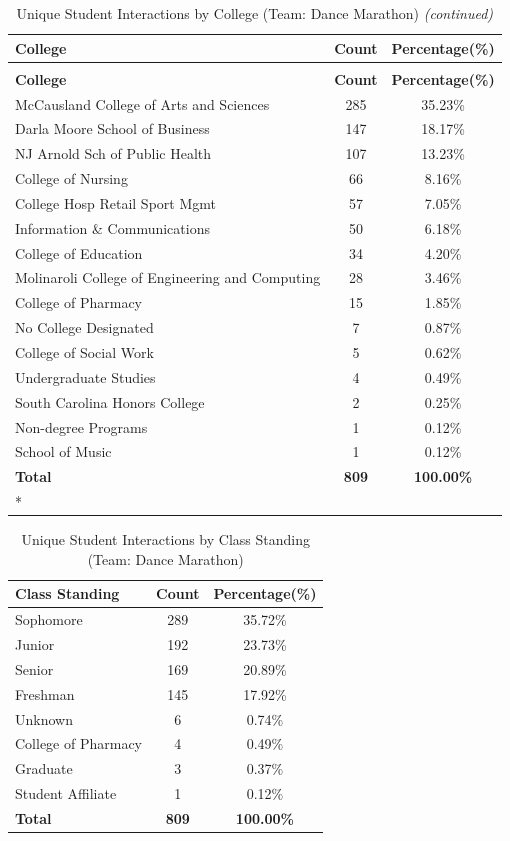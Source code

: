 \documentclass[
  letterpaper,
  DIV=11,
  numbers=noendperiod]{scrartcl}
\begin{document}
\begin{longtable}[t]{lcc}
\caption{\label{tab:CollegeTabUSCDM}Unique Student Interactions by College (Team: Dance Marathon)}\\
\toprule
\textbf{College} & \textbf{Count} & \textbf{Percentage(\%)}\\
\midrule
\endfirsthead
\caption[]{Unique Student Interactions by College (Team: Dance Marathon) \textit{(continued)}}\\
\toprule
\textbf{College} & \textbf{Count} & \textbf{Percentage(\%)}\\
\midrule
\endhead

\endfoot
\bottomrule
\endlastfoot
McCausland College of Arts and Sciences & 285 & 35.23\%\\
Darla Moore School of Business & 147 & 18.17\%\\
NJ Arnold Sch of Public Health & 107 & 13.23\%\\
College of Nursing & 66 & 8.16\%\\
College Hosp Retail Sport Mgmt & 57 & 7.05\%\\
\addlinespace
Information \& Communications & 50 & 6.18\%\\
College of Education & 34 & 4.20\%\\
Molinaroli College of Engineering and Computing & 28 & 3.46\%\\
College of Pharmacy & 15 & 1.85\%\\
No College Designated & 7 & 0.87\%\\
\addlinespace
College of Social Work & 5 & 0.62\%\\
Undergraduate Studies & 4 & 0.49\%\\
South Carolina Honors College & 2 & 0.25\%\\
Non-degree Programs & 1 & 0.12\%\\
School of Music & 1 & 0.12\%\\
\midrule
\addlinespace
\textbf{Total} & \textbf{809} & \textbf{100.00\%}\\*
\end{longtable}
\endgroup{}

\begingroup\fontsize{10}{12}\selectfont

\begin{longtable}[t]{lcc}
\caption{\label{tab:OvrllClssStnd_USCDM}Unique Student Interactions by Class Standing (Team: Dance Marathon)}\\
\toprule
\textbf{Class Standing} & \textbf{Count} & \textbf{Percentage(\%)}\\
\midrule
Sophomore & 289 & 35.72\%\\
Junior & 192 & 23.73\%\\
Senior & 169 & 20.89\%\\
Freshman & 145 & 17.92\%\\
Unknown & 6 & 0.74\%\\
College of Pharmacy & 4 & 0.49\%\\
Graduate & 3 & 0.37\%\\
Student Affiliate & 1 & 0.12\%\\
\midrule
\textbf{Total} & \textbf{809} & \textbf{100.00\%}\\
\bottomrule
\end{longtable}
\endgroup{}
\end{document}
